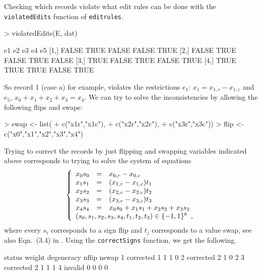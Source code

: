 \documentclass[11pt, fleqn, a4paper]{article}
\begin{document}
Checking which records violate what edit rules can be done with the {\tt
violatedEdits} function of {\tt editrules}. 
\begin{Schunk}
\begin{Sinput}
> violatedEdits(E, dat)
\end{Sinput}
\begin{Soutput}
        e1    e2    e3    e4    e5
[1,] FALSE  TRUE FALSE FALSE  TRUE
[2,] FALSE  TRUE FALSE  TRUE FALSE
[3,]  TRUE FALSE  TRUE FALSE  TRUE
[4,]  TRUE  TRUE  TRUE FALSE  TRUE
\end{Soutput}
\end{Schunk}
So record 1 (case a) for example, violates the restrictions $e_1$:
$x_1=x_{1,r}-x_{1,c}$ and $e_5$, $x_0+x_1+x_2+x_3=x_4$.  We can try to solve the
inconsistencies by allowing the following flips and swaps:
\begin{Schunk}
\begin{Sinput}
> swap <- list(
+     c("x1r","x1c"), 
+     c("x2r","x2c"), 
+     c("x3r","x3c"))
> flip <- c("x0","x1","x2","x3","x4")
\end{Sinput}
\end{Schunk}
%
Trying to correct the records by just flipping and swapping variables
indicated above corresponds to trying to solve the system of equations
\begin{equation}
\left\{\begin{array}{lcl}
x_0s_0 &=& x_{0,r}-x_{0,c}\\
x_1s_1 &=& (x_{1,r}-x_{1,c})t_1\\
x_2s_2 &=& (x_{2,r}-x_{2,c})t_2\\
x_3s_3 &=& (x_{3,r}-x_{3,c})t_3\\
x_4s_4 &=& x_0s_0 + x_1s_1 + x_2s_2 + x_3s_3\\
\multicolumn{3}{l}{(s_0,s_1,s_2,s_3,s_4,t_1,t_2,t_3)\in\{-1,1\}^{8}},
\end{array}\right.
\end{equation}
where every $s_i$ corresponds to a sign flip and $t_j$ corresponds
to a value swap, see also Eqn.\ (3.4) in \cite{scholtus:2008}.
Using the {\tt correctSigns} function, we get the following.
\begin{Schunk}
\begin{Soutput}
     status weight degeneracy nflip nswap
1 corrected      1          1     1     0
2 corrected      2          1     0     2
3 corrected      2          1     1     1
4   invalid      0          0     0     0
\end{Soutput}
\end{Schunk}
\end{document}
